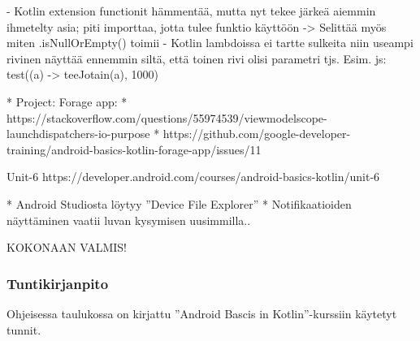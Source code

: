 - Kotlin extension functionit hämmentää, mutta nyt tekee järkeä aiemmin ihmetelty asia; piti importtaa, jotta tulee funktio käyttöön
  -> Selittää myös miten .isNullOrEmpty() toimii
- Kotlin lambdoissa ei tartte sulkeita niin useampi rivinen näyttää ennemmin siltä, että toinen rivi olisi parametri tjs. Esim. js: test((a) -> teeJotain(a), 1000)

* Project: Forage app:
  * https://stackoverflow.com/questions/55974539/viewmodelscope-launchdispatchers-io-purpose
  * https://github.com/google-developer-training/android-basics-kotlin-forage-app/issues/11

Unit-6 https://developer.android.com/courses/android-basics-kotlin/unit-6

* Android Studiosta löytyy ''Device File Explorer''
* Notifikaatioiden näyttäminen vaatii luvan kysymisen uusimmilla..

KOKONAAN VALMIS!


\subsubsection{Tuntikirjanpito}

Ohjeisessa taulukossa on kirjattu ''Android Bascis in Kotlin''-kurssiin käytetyt tunnit.


